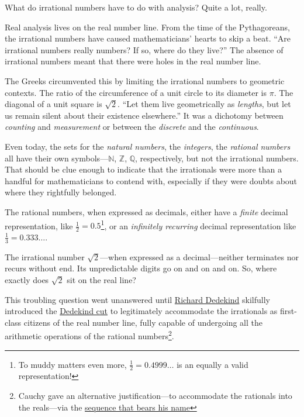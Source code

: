 \documentclass[
  a4paper,
]{article}
\begin{document}
What do irrational numbers have to do with analysis? Quite a lot,
really.

Real analysis lives on the real number line. From the time of the
Pythagoreans, the irrational numbers have caused mathematicians' hearts
to skip a beat. ``Are irrational numbers really numbers? If so, where do
they live?'' The absence of irrational numbers meant that there were
holes in the real number line.

The Greeks circumvented this by limiting the irrational numbers to
geometric contexts. The ratio of the circumference of a unit circle to
its diameter is \(\pi\). The diagonal of a unit square is \(\sqrt{2}\).
``Let them live geometrically as \emph{lengths}, but let us remain
silent about their existence elsewhere.'' It was a dichotomy between
\emph{counting} and \emph{measurement} or between the \emph{discrete}
and the \emph{continuous}.

Even today, the sets for the \emph{natural numbers}, the
\emph{integers}, the \emph{rational numbers} all have their own
symbols---\(\mathbb{N}\), \(\mathbb{Z}\), \(\mathbb{Q}\), respectively,
but not the irrational numbers. That should be clue enough to indicate
that the irrationals were more than a handful for mathematicians to
contend with, especially if they were doubts about where they rightfully
belonged.

The rational numbers, when expressed as decimals, either have a
\emph{finite} decimal representation, like
\(\frac{1}{2} = 0.5\)\footnote{To muddy matters even more,
  \(\frac{1}{2} = 0.4999\dots\) is an equally a valid representation!},
or an \emph{infinitely recurring} decimal representation like
\(\frac{1}{3} = 0.333\dots\).

The irrational number \(\sqrt{2}\)---when expressed as a
decimal---neither terminates nor recurs without end. Its unpredictable
digits go on and on and on. So, where exactly does \(\sqrt{2}\) sit on
the real line?

This troubling question went unanswered until
\href{https://plato.stanford.edu/entries/dedekind-foundations/}{Richard
Dedekind} skilfully introduced the
\href{https://www.britannica.com/science/Dedekind-cut}{Dedekind cut} to
legitimately accommodate the irrationals as first-class citizens of the
real number line, fully capable of undergoing all the arithmetic
operations of the rational numbers\footnote{Cauchy gave an alternative
  justification---to accommodate the rationals into the reals---via the
  \hyperref[cauchy-sequence]{sequence that bears his name}}.
\end{document}
